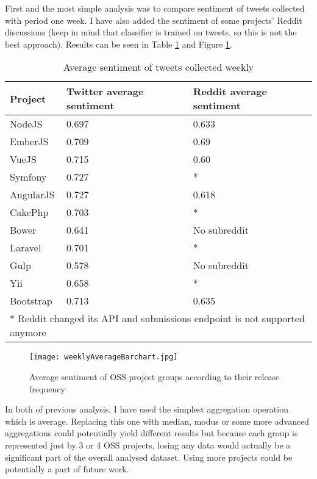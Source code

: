 First and the most simple analysis was to compare sentiment of tweets collected with period one week. I have also added the sentiment of some projects' Reddit discussions (keep in mind that classifier is trained on tweets, so this is not the best approach). Results can be seen in Table \ref{table:weeklyAverageTable} and Figure \ref{fig:weeklyAverageBarchart}.

\begin{table}[H]
\centering
\begin{tabular}{ |p{2cm}|p{5.5cm}|p{5.5cm}|}
 \hline
\textbf{Project }& \textbf{Twitter average sentiment} & \textbf{Reddit average sentiment}\\
 \hline
 NodeJS   & 0.697   & 0.633 \\ \hline
 EmberJS   & 0.709   & 0.69\\ \hline
 VueJS   & 0.715   & 0.60\\ \hline 
 Symfony & 0.727   & *\\ \hline   
 AngularJS   & 0.727   & 0.618\\ \hline
 CakePhp & 0.703  & * \\ \hline 
 Bower   & 0.641   & No subreddit\\ \hline 
 Laravel & 0.701   & *\\ \hline
 Gulp & 0.578   & No subreddit\\ \hline
 Yii & 0.658  & * \\ \hline
 Bootstrap & 0.713  & 0.635\\ \hline
 \multicolumn{3}{l}{* Reddit changed its API and submissions endpoint is not supported anymore}
\end{tabular}
\caption{Average sentiment of tweets collected weekly}
\label{table:weeklyAverageTable}
\end{table}


\begin{figure}[H]%
    \centering
	\texttt{[image: weeklyAverageBarchart.jpg]}
    \caption{Average sentiment of OSS project groups according to their release frequency}%
    \label{fig:weeklyAverageBarchart}%
\end{figure}

In both of previous analysis, I have used the simplest aggregation operation which is average. Replacing this one with median, modus or some more advanced aggregations could potentially yield different results but because each group is represented just by 3 or 4 OSS projects, losing any data would actually be a significant part of the overall analysed dataset. Using more projects could be potentially a part of future work.
